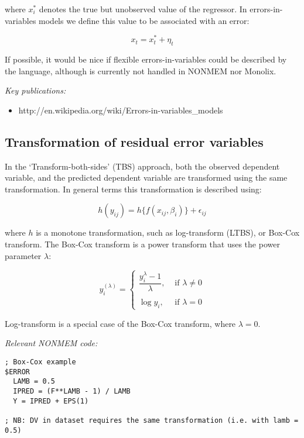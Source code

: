 \documentclass[a4paper,11pt]{article}
\begin{document}
\noindent where $x_i^\ast$ denotes the true but unobserved value of
the regressor. In errors-in-variables models we define this value to be associated with an error: 

\begin{equation}
x_t = x_t^\ast + \eta_t 
\end{equation}

If possible, it would be nice if flexible errors-in-variables could be
described by the language, although is currently not handled in NONMEM
nor Monolix. 

\vspace{10pt}
\noindent \emph{Key publications:}
\begin{itemize}
\item http://en.wikipedia.org/wiki/Errors-in-variables\_models
\end{itemize}

\subsection{Transformation of residual error variables}
In the `Transform-both-sides' (TBS) approach, both the observed
dependent variable, and the predicted dependent variable are
transformed using the same transformation. In general terms this
transformation is described using:

\begin{equation}
h(y_{ij}) = h \{ f(x_{ij}, \beta_i) \} + \epsilon_{ij} 
\end{equation}

\noindent where $h$ is a monotone transformation, such as
log-transform (LTBS), or Box-Cox transform. The Box-Cox transform is a
power transform that uses the power parameter $\lambda$: 

\begin{equation}
y_i^{(\lambda)} =
\begin{cases}
\dfrac{y_i^\lambda-1}{\lambda}, &\mbox{ if } \lambda \neq 0 \\ \\
\log{y_i} , &\mbox{ if } \lambda = 0
\end{cases}
\end{equation}

\noindent Log-transform is a special case of the Box-Cox transform, where $\lambda = 0$. 

\noindent \emph{Relevant NONMEM code:}
\begin{lstlisting}
; Box-Cox example
$ERROR
  LAMB = 0.5
  IPRED = (F**LAMB - 1) / LAMB
  Y = IPRED + EPS(1) 
  
; NB: DV in dataset requires the same transformation (i.e. with lamb = 0.5)
\end{lstlisting}
\end{document}
